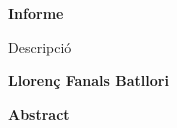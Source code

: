 \thispagestyle{plain}

\begin{center}
	\large
	\textbf{Informe}
	
	\vspace{0.4cm}
	\large
	Descripció
	
	\vspace{0.4cm}
	\textbf{Llorenç Fanals Batllori}
	
	\vspace{0.9cm}
	\textbf{Abstract}
\end{center}
\lipsum[1]


